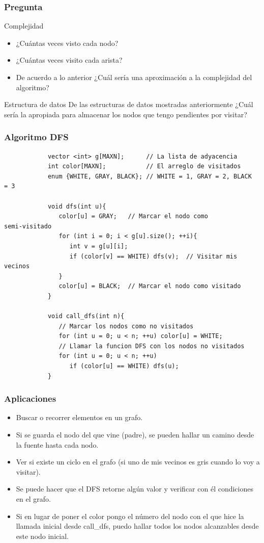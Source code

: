 \documentclass{beamer}
\begin{document}
	\begin{frame}
		\frametitle{Pregunta}
		\begin{alertblock}{Complejidad}
			\begin{itemize}
				\item ¿Cuántas veces visto cada nodo?
				\item ¿Cuántas veces visito cada arista?
				\item De acuerdo a lo anterior ¿Cuál sería una
aproximación a la complejidad del algoritmo?
			\end{itemize}
		\end{alertblock}
		\pause
		\begin{alertblock}{Estructura de datos}
			De las estructuras de datos mostradas anteriormente
¿Cuál sería la apropiada para almacenar los nodos que tengo pendientes por
visitar?
		\end{alertblock}
	\end{frame}

	\begin{frame}[fragile]
		\frametitle{Algoritmo DFS}
		\begin{lstlisting}
			vector <int> g[MAXN];      // La lista de adyacencia
			int color[MAXN];           // El arreglo de visitados
			enum {WHITE, GRAY, BLACK}; // WHITE = 1, GRAY = 2, BLACK
= 3

			void dfs(int u){
			   color[u] = GRAY;   // Marcar el nodo como
semi-visitado
			   for (int i = 0; i < g[u].size(); ++i){
			      int v = g[u][i];
			      if (color[v] == WHITE) dfs(v);  // Visitar mis
vecinos
			   }
			   color[u] = BLACK;  // Marcar el nodo como visitado
			}

			void call_dfs(int n){
			   // Marcar los nodos como no visitados
			   for (int u = 0; u < n; ++u) color[u] = WHITE;
			   // Llamar la funcion DFS con los nodos no visitados
			   for (int u = 0; u < n; ++u)
			      if (color[u] == WHITE) dfs(u);
			}
		\end{lstlisting}
	\end{frame}

	\begin{frame}
		\frametitle{Aplicaciones}
		\begin{itemize}
			\item Buscar o recorrer elementos en un grafo.
			\item Si se guarda el nodo del que vine (padre), se
pueden hallar un camino desde la fuente hasta cada nodo.
			\item Ver si existe un ciclo en el grafo (si uno de mis
vecinos es gris cuando lo voy a visitar).
			\item Se puede hacer que el DFS retorne algún valor y
verificar con él condiciones en el grafo.
			\item Si en lugar de poner el color pongo el número del
nodo con el que hice la llamada inicial desde call\_dfs, puedo hallar todos los
nodos alcanzables desde este nodo inicial.
		\end{itemize}
	\end{frame}
\end{document}
